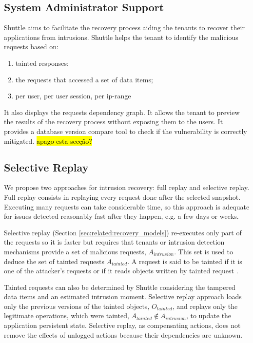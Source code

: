 \subsection{System Administrator Support}
\label{sec:arch:system_admin_support}

Shuttle aims to facilitate the recovery process aiding the tenants to recover their applications from intrusions. Shuttle helps the tenant to identify the malicious requests based on: 
\begin{enumerate}
\item tainted responses;
\item the requests that accessed a set of data items;
\item per user, per user session, per ip-range
\end{enumerate}

 It also displays the requests dependency graph. It allows the tenant to preview the results of the recovery process without exposing them to the users. It provides a database version compare tool to check if the vulnerability is correctly mitigated.
\hl{apago esta secção?}

\subsection{Selective Replay}
\label{sec:arch:selective_replay}

We propose two approaches for intrusion recovery: full replay and selective replay. Full replay consists in replaying every request done after the selected snapshot. Executing many requests can take considerable time, so this approach is adequate for issues detected reasonably fast after they happen, e.g. a few days or weeks.

Selective replay (Section \ref{sec:related:recovery_models}) re-executes only part of the requests so it is faster but requires that tenants or intrusion detection mechanisms provide a set of malicious requests, $A_{intrusion}$. This set is used to deduce the set of tainted requests $A_{tainted}$. A request is said to be tainted if it is one of the attacker’s requests or if it reads objects written by tainted request \cite{taser,itdb,phoenix}. 

Tainted requests can also be determined by Shuttle considering the tampered data items and an estimated intrusion moment. Selective replay approach loads only the previous versions of the tainted objects, $O_{tainted}$, and replays only the legitimate operations, which were tainted, $A_{tainted} \notin A_{intrusion}$, to update the application persistent state. Selective replay, as compensating actions, does not remove the effects of unlogged actions because their dependencies are unknown. 

